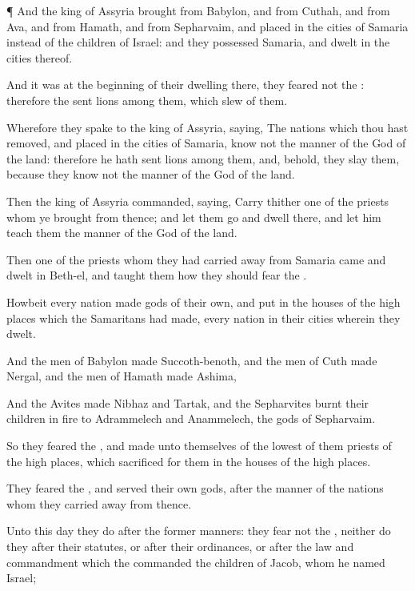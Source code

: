 {\par }{\PP {}¶ And the
king of
Assyria
brought
{} from
Babylon, and from
Cuthah, and from
Ava, and from
Hamath, and from
Sepharvaim, and
placed
{} in the
cities of
Samaria instead of the
children of
Israel: and they
possessed
Samaria, and
dwelt in the
cities thereof.

And
{} it was at the
beginning of their
dwelling there,
{} they
feared not the
{}: therefore the
{}
sent
lions among them, which
slew
{} of them.

Wherefore they
spake to the
king of
Assyria,
saying, The
nations which thou hast
removed, and
placed in the
cities of
Samaria,
know not the
manner of the
God of the
land: therefore he hath
sent
lions among them, and, behold, they
slay them, because they
know not the
manner of the
God of the
land.

Then the
king of
Assyria
commanded,
saying,
Carry thither
one of the
priests whom ye
brought from thence; and let them
go and
dwell there, and let him
teach them the
manner of the
God of the
land.

Then
one of the
priests whom they had carried
away from
Samaria
came and
dwelt in
Beth-el, and
taught them how they should
fear the
{}.

Howbeit every
nation
made
gods of their own, and
put
{} in the
houses of the high
places which the
Samaritans had
made, every
nation in their
cities wherein they
dwelt.

And the
men of
Babylon
made
Succoth-benoth, and the
men of
Cuth
made
Nergal, and the
men of
Hamath
made
Ashima,

And the
Avites
made
Nibhaz and
Tartak, and the
Sepharvites
burnt their
children in
fire to
Adrammelech and
Anammelech, the
gods of
Sepharvaim.

So they
feared the
{}, and
made unto themselves of the
lowest of them
priests of the high
places, which
sacrificed for them in the
houses of the high
places.

They
feared the
{}, and
served their own
gods, after the
manner of the
nations whom they carried
away from thence.

Unto this
day they
do after the
former
manners: they
fear not the
{}, neither
do they after their
statutes, or after their
ordinances, or after the
law and
commandment which the
{}
commanded the
children of
Jacob, whom he
named
Israel;

}
